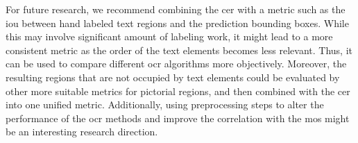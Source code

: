 For future research, we recommend combining the \gls{cer} with a metric such as the \gls{iou} between hand labeled text regions and the prediction bounding boxes.
While this may involve significant amount of labeling work, it might lead to a more consistent metric as the order of the text elements becomes less relevant.
Thus, it can be used to compare different \gls{ocr} algorithms more objectively.
Moreover, the resulting regions that are not occupied by text elements could be evaluated by other more suitable metrics for pictorial regions, and then combined with the \gls{cer} into one unified metric.
Additionally, using preprocessing steps to alter the performance of the \gls{ocr} methods and improve the correlation with the \gls{mos} might be an interesting research direction.
